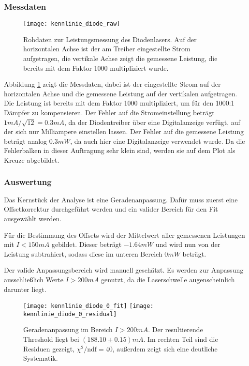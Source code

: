 \documentclass{../Misc/MontavonLaTeX/Montavon}
\newcommand{\halfwidth}{0.48\textwidth}
\begin{document}
\subsubsection{Messdaten}
\begin{figure}[htbp]
\centering
\texttt{[image: kennlinie\_diode\_raw]}
\caption{Rohdaten zur Leistungsmessung des Diodenlasers. Auf der horizontalen Achse ist der am Treiber eingestellte Strom aufgetragen, die vertikale Achse zeigt die gemessene Leistung, die bereits mit dem Faktor 1000 multipliziert wurde.}
\label{fig:kennlinie_diode_raw}
\end{figure}

Abbildung \ref{fig:kennlinie_diode_raw} zeigt die Messdaten, dabei ist der eingestellte Strom auf der horizontalen Achse und die gemessene Leistung auf der vertikalen aufgetragen. Die Leistung ist bereits mit dem Faktor 1000 multipliziert, um für den 1000:1 Dämpfer zu kompensieren. Der Fehler auf die Stromeinstellung beträgt $1 \unit{mA} / \sqrt{12} = 0.3 \unit{mA}$, da der Diodentreiber über eine Digitalanzeige verfügt, auf der sich nur Milliampere einstellen lassen. Der Fehler auf die gemessene Leistung beträgt analog $0.3 \unit{mW}$, da auch hier eine Digitalanzeige verwendet wurde. Da die Fehlerbalken in dieser Auftragung sehr klein sind, werden sie auf dem Plot als Kreuze abgebildet.

\subsubsection{Auswertung}
Das Kernstück der Analyse ist eine Geradenanpassung. Dafür muss zuerst eine Offsetkorrektur durchgeführt werden und ein valider Bereich für den Fit ausgewählt werden. 

Für die Bestimmung des Offsets wird der Mittelwert aller gemessenen Leistungen mit $I < 150 \unit{mA}$ gebildet. Dieser beträgt $-1.64 \unit{mW}$ und wird nun von der Leistung subtrahiert, sodass diese im unteren Bereich $0 \unit{mW}$ beträgt.

Der valide Anpassungsbereich wird manuell geschätzt. Es werden zur Anpassung ausschließlich Werte $I > 200 \unit{mA}$ genutzt, da die Laserschwelle augenscheinlich darunter liegt.

\begin{figure}[htbp]
\centering
\texttt{[image: kennlinie\_diode\_0\_fit]}
\texttt{[image: kennlinie\_diode\_0\_residual]}
\caption{Geradenanpassung im Bereich $I > 200 \unit{mA}$. Der resultierende Threshold liegt bei $(188.10 \pm 0.15) \unit{mA}$. Im rechten Teil sind die Residuen gezeigt, $\chi^2 / \textrm{ndf} = 40$, außerdem zeigt sich eine deutliche Systematik.}
\label{fig:kennlinie_diode_0_fit}
\end{figure}
\end{document}
